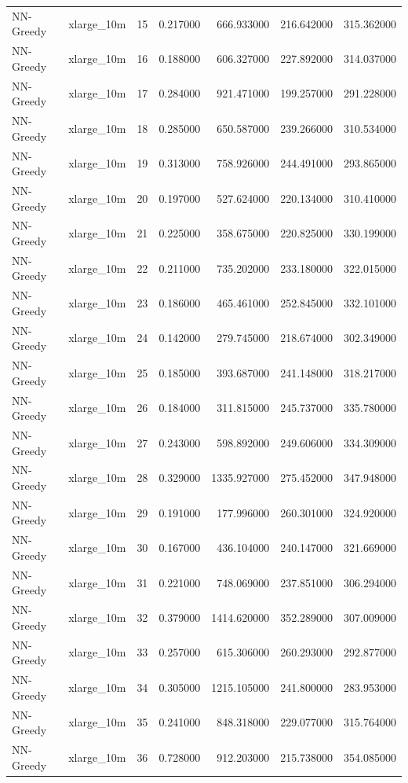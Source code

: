 \begin{tabular}{llrrrrr}
NN-Greedy & xlarge_10m & 15 & 0.217000 & 666.933000 & 216.642000 & 315.362000 \\
NN-Greedy & xlarge_10m & 16 & 0.188000 & 606.327000 & 227.892000 & 314.037000 \\
NN-Greedy & xlarge_10m & 17 & 0.284000 & 921.471000 & 199.257000 & 291.228000 \\
NN-Greedy & xlarge_10m & 18 & 0.285000 & 650.587000 & 239.266000 & 310.534000 \\
NN-Greedy & xlarge_10m & 19 & 0.313000 & 758.926000 & 244.491000 & 293.865000 \\
NN-Greedy & xlarge_10m & 20 & 0.197000 & 527.624000 & 220.134000 & 310.410000 \\
NN-Greedy & xlarge_10m & 21 & 0.225000 & 358.675000 & 220.825000 & 330.199000 \\
NN-Greedy & xlarge_10m & 22 & 0.211000 & 735.202000 & 233.180000 & 322.015000 \\
NN-Greedy & xlarge_10m & 23 & 0.186000 & 465.461000 & 252.845000 & 332.101000 \\
NN-Greedy & xlarge_10m & 24 & 0.142000 & 279.745000 & 218.674000 & 302.349000 \\
NN-Greedy & xlarge_10m & 25 & 0.185000 & 393.687000 & 241.148000 & 318.217000 \\
NN-Greedy & xlarge_10m & 26 & 0.184000 & 311.815000 & 245.737000 & 335.780000 \\
NN-Greedy & xlarge_10m & 27 & 0.243000 & 598.892000 & 249.606000 & 334.309000 \\
NN-Greedy & xlarge_10m & 28 & 0.329000 & 1335.927000 & 275.452000 & 347.948000 \\
NN-Greedy & xlarge_10m & 29 & 0.191000 & 177.996000 & 260.301000 & 324.920000 \\
NN-Greedy & xlarge_10m & 30 & 0.167000 & 436.104000 & 240.147000 & 321.669000 \\
NN-Greedy & xlarge_10m & 31 & 0.221000 & 748.069000 & 237.851000 & 306.294000 \\
NN-Greedy & xlarge_10m & 32 & 0.379000 & 1414.620000 & 352.289000 & 307.009000 \\
NN-Greedy & xlarge_10m & 33 & 0.257000 & 615.306000 & 260.293000 & 292.877000 \\
NN-Greedy & xlarge_10m & 34 & 0.305000 & 1215.105000 & 241.800000 & 283.953000 \\
NN-Greedy & xlarge_10m & 35 & 0.241000 & 848.318000 & 229.077000 & 315.764000 \\
NN-Greedy & xlarge_10m & 36 & 0.728000 & 912.203000 & 215.738000 & 354.085000 \\

\end{tabular}
